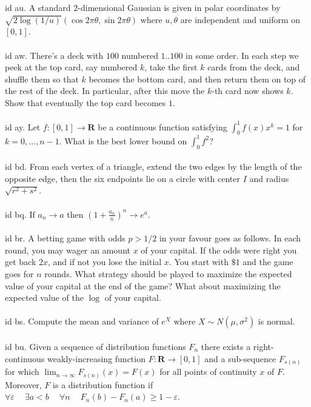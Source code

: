 \documentclass[oneside]{book}
\newcommand{\eps}{\varepsilon}
\newcommand{\R}{\mathbf{R}}
\newcommand{\fit}[1]{\left( #1\right)}
\newcommand{\spc}{\phantom{-}}
\begin{document}
id au. A standard $2$-dimensional Gaussian is given in polar coordinates by $\sqrt{2\log(1/u)}(\cos2\pi\theta,\sin2\pi\theta)$ where $u,\theta$ are independent and uniform on $[0,1]$. \\\\

id aw. There's a deck with $100$ numbered $1..100$ in some order. In each step we peek at the top card, say numbered $k$, take the first $k$ cards from the deck, and shuffle them so that $k$ becomes the bottom card, and then return them on top of the rest of the deck. In particular, after this move the $k$-th card now shows $k$. Show that eventually the top card becomes $1$.  \\\\


id ay. Let $f:[0,1]\to\R$ be a continuous function satisfying $\int_0^1 f(x)x^k=1$ for $k=0,\dots,n-1$. What is the best lower bound on $\int_0^1 f^2$? \\\\


id bd. From each vertex of a triangle, extend the two edges by the length of the opposite edge, then the six endpoints lie on a circle with center $I$ and radius $\sqrt{r^2+s^2}$. \\\\


id bq. If $a_n\to a$ then $\fit{1+\frac{a_n}{n}}^n\to e^a$. \\\\


id br. A betting game with odds $p>1/2$ in your favour goes as follows. In each round, you may wager an amount $x$ of your capital. If the odds were right you get back $2x$, and if not you lose the initial $x$. You start with $\$1$ and the game goes for $n$ rounds. What strategy should be played to maximize the expected value of your capital at the end of the game? What about maximizing the expected value of the $\log$ of your capital. \\\\


id bs. Compute the mean and variance of $e^X$ where  $X\sim N(\mu,\sigma^2)$ is normal. \\\\


id bu. Given a sequence of distribution functions $F_n$ there exists a right-continuous weakly-increasing function $F:\R\to[0,1]$ and a sub-sequence $F_{s(n)}$ for which $\displaystyle\lim_{n\to\infty}F_{s(n)}(x)=F(x)$ for all points of continuity $x$ of $F$. Moreover, $F$ is a distribution function if $\forall\eps\spc\exists a<b\spc\forall n\spc F_n(b)-F_n(a)\ge 1-\eps$.\\\\
\end{document}
